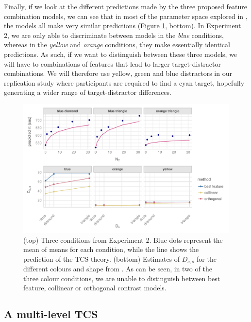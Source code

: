\documentclass[smallextended, natbib]{svjour3}       %
\begin{document}
Finally, if we look at the different predictions made by the three proposed feature combination models, we can see that in most of the parameter space explored in \cite{buetti2019predicting}, the models all make very similar predictions (Figure \ref{fig:comp_rep_conditions}, bottom). In Experiment 2, we are only able to discriminate between models in the \textit{blue} conditions, whereas in the \textit{yellow} and \textit{orange} conditions, they make essentially identical predictions. As such, if we want to distinguish between these three models, we will have to combinations of features that lead to larger target-distractor combinations. We will therefore use yellow, green and blue distractors in our replication study where participants are required to find a cyan target, hopefully generating a wider range of target-distractor differences.

\begin{figure}
\centering
\includegraphics[width=\textwidth]{../plots/computational_replication_issues.pdf}
\caption{(top) Three conditions from Experiment 2. Blue dots represent the mean of means for each condition, while the line shows the prediction of the TCS theory. (bottom) Estimates of $D_{c,s}$ for the different colours and shape from \cite{buetti2019predicting}. As can be seen, in two of the three colour conditions, we are unable to distinguish between best feature, collinear or orthogonal contrast models.}
\label{fig:comp_rep_conditions}
\end{figure}

\subsection{A multi-level TCS}
\label{sec:reanalysis}
\end{document}
